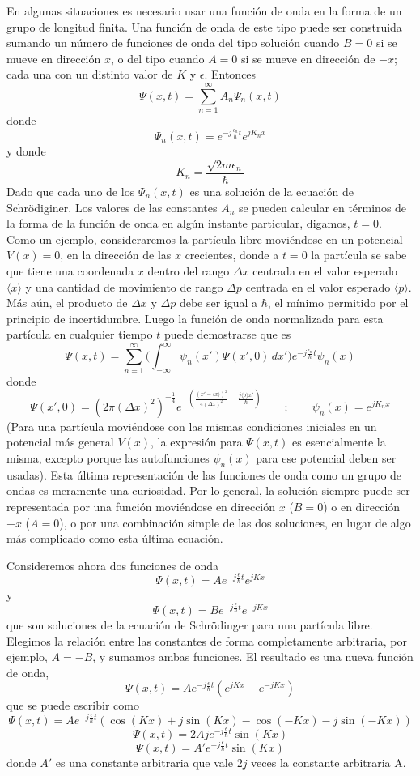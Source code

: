 \documentclass[12pt,a4paper]{article}
\def\e{{\epsilon}} %
\begin{document}
En algunas situaciones es necesario usar una función de onda en la forma de un grupo de longitud finita. Una función de onda de este tipo puede ser construida sumando un número de funciones de onda del tipo solución cuando $B=0$ si se mueve en dirección $x$, o del tipo cuando $A=0$ si se mueve en dirección de $-x$; cada una con un distinto valor de $K$ y $\e$. Entonces
\[ \Psi(x,t)=\sum _{n=1}^{\infty} A_{n} \Psi _{n}(x,t) \]
donde
\[ \Psi _{n}(x,t)=e^{-j\frac{\e _{n}}{\hbar}t}e^{jK_{n}x} \]
y donde
\[ K_{n}=\frac{\sqrt{2m\e_{n}}}{\hbar} \]
Dado que cada uno de los $\Psi _{n}(x,t)$ es una solución de la ecuación de Schrödiginer. Los valores de las constantes $A_{n}$ se pueden calcular en términos de la forma de la función de onda en algún instante particular, digamos, $t=0$. Como un ejemplo, consideraremos la partícula libre moviéndose en un potencial $V(x)=0$, en la dirección de las $x$ crecientes, donde a $t=0$ la partícula se sabe que tiene una coordenada $x$ dentro del rango $\Delta x$ centrada en el valor esperado $\langle x \rangle$ y una cantidad de movimiento de rango $\Delta p$ centrada en el valor esperado $\langle p \rangle$. Más aún, el producto de $\Delta x$ y $\Delta p$ debe ser igual a $\hbar$, el mínimo permitido por el principio de incertidumbre. Luego la función de onda normalizada para esta partícula en cualquier tiempo $t$ puede demostrarse que es
\[ \Psi (x,t)=\sum _{n=1}^{\infty} \bigg( \int _{-\infty}^{\infty} \psi _{n}(x')\Psi (x',0)\, dx' \bigg)e^{-j\frac{\e _{n}}{\hbar}t}\psi _{n}(x) \]
donde
\[ \Psi (x',0)=(2 \pi (\Delta x)^{2})^{-\frac{1}{4}}e^{-(\frac{(x'-\langle x \rangle)^{2}}{4(\Delta x)^{2}}-\frac{j \langle p \rangle x'}{\hbar})} \qquad ; \qquad \psi _{n}(x)=e^{jK_{n}x} \]
(Para una partícula moviéndose con las mismas condiciones iniciales en un potencial más general $V(x)$, la expresión para $\Psi (x,t)$ es esencialmente la misma, excepto porque las autofunciones $\psi _{n}(x)$ para ese potencial deben ser usadas). Esta última representación de las funciones de onda como un grupo de ondas es meramente una curiosidad. Por lo general, la solución siempre puede ser representada por una función moviéndose en dirección $x$ ($B=0$) o en dirección $-x$ ($A=0$), o por una combinación simple de las dos soluciones, en lugar de algo más complicado como esta última ecuación.

Consideremos ahora dos funciones de onda
\[ \Psi (x,t)=Ae^{-j\frac{\e}{\hbar}t}e^{jKx} \]
y
\[ \Psi (x,t)=Be^{-j\frac{\e}{\hbar}t}e^{-jKx} \]
que son soluciones de la ecuación de Schrödinger para una partícula libre. Elegimos la relación entre las constantes de forma completamente arbitraria, por ejemplo, $A=-B$, y sumamos ambas funciones. El resultado es una nueva función de onda,
\[ \Psi (x,t)=Ae^{-j\frac{\e}{\hbar}t}(e^{jKx}-e^{-jKx}) \]
que se puede escribir como
\[ \Psi (x,t)=Ae^{-j\frac{\e}{\hbar}t}(\cos(Kx)+j\sin(Kx)-\cos(-Kx)-j\sin(-Kx)) \]
\[ \Psi (x,t)=2Aje^{-j\frac{\e}{\hbar}t}\sin (Kx) \]
\[ \Psi (x,t)=A'e^{-j\frac{\e}{\hbar}t}\sin (Kx) \]
donde $A'$ es una constante arbitraria que vale $2j$ veces la constante arbitraria A.
\end{document}
